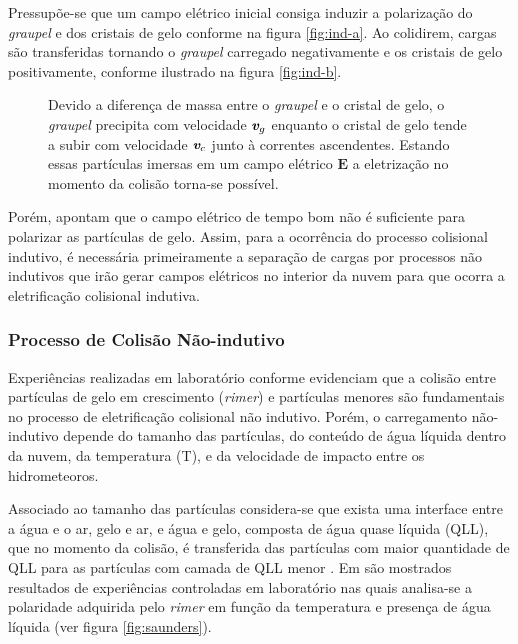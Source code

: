 Pressupõe-se que um campo elétrico inicial consiga induzir a polarização do \textit{graupel} e dos cristais de gelo conforme na figura \ref{fig:ind-a}. Ao colidirem, cargas são transferidas tornando o \textit{graupel} carregado negativamente e os cristais de gelo positivamente, conforme ilustrado na figura \ref{fig:ind-b}.

\begin{figure}[htp]
   \centering
   \caption{Devido a diferença de massa entre o \textit{graupel} e o cristal de gelo, o \textit{graupel} precipita com velocidade $\textit{\textbf{v}}_g$ enquanto o cristal de gelo tende a subir com velocidade $\textit{\textbf{v}}_c$ junto à correntes ascendentes. Estando essas partículas imersas em um campo elétrico $\textbf{E}$ a eletrização no momento da colisão torna-se possível.}
   \label{fig:ind}
\end{figure}


Porém,  apontam que o campo elétrico de tempo bom não é suficiente para polarizar as partículas de gelo. Assim, para a ocorrência do processo colisional indutivo, é necessária primeiramente a separação de cargas por processos não indutivos que irão gerar campos elétricos no interior da nuvem para que ocorra a eletrificação colisional indutiva.


\subsubsection{Processo de Colisão Não-indutivo}

Experiências realizadas em laboratório conforme  evidenciam que a colisão entre partículas de gelo em crescimento (\textit{rimer}) e partículas menores são fundamentais no processo de eletrificação colisional não indutivo. Porém, o carregamento não-indutivo depende do tamanho das partículas, do conteúdo de água líquida dentro da nuvem, da temperatura (T), e da velocidade de impacto entre os hidrometeoros.

Associado ao tamanho das partículas considera-se que exista uma interface entre a água e o ar, gelo e ar, e água e gelo, composta de água quase líquida (QLL), que no momento da colisão, é transferida das partículas com maior quantidade de QLL para as partículas com camada de QLL menor \cite[apud \cite{rachel}]{baker1994}.
Em  são mostrados resultados de experiências controladas em laboratório nas quais analisa-se a polaridade adquirida pelo \textit{rimer} em função da temperatura e presença de água líquida (ver figura \ref{fig:saunders}). 

